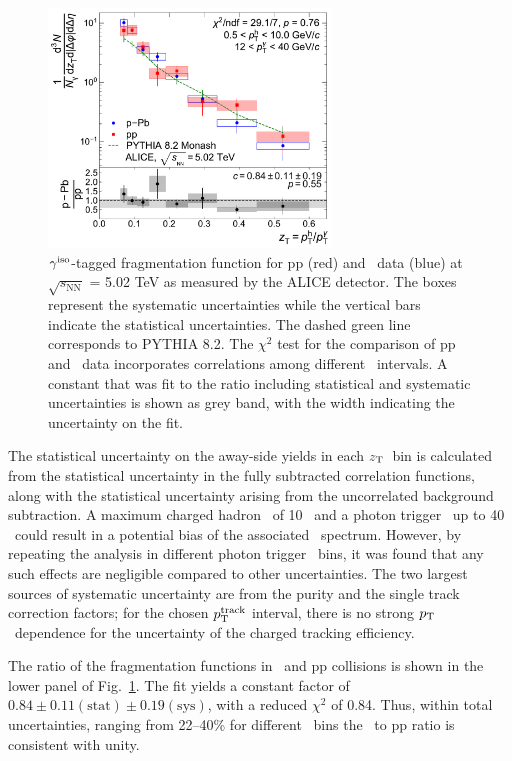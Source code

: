 \begin{figure}
    \centering
    \includegraphics[width=0.67\textwidth]{Data_Analysis/gammahadron/Final_FFunction_and_Ratio.pdf}
    \caption{$\gamma^\mathrm{iso}$-tagged fragmentation function for pp (red) and \pPb~data (blue) at $\sqrt{s_\mathrm{NN}}$ = 5.02 TeV as measured by the ALICE detector. The boxes represent the systematic uncertainties while the vertical bars indicate the statistical uncertainties. The dashed green line corresponds to \textsc{PYTHIA 8.2}. The $\chi^2$ test for the comparison of pp and \pPb~data incorporates correlations among different \zt~intervals. A constant that was fit to the ratio including statistical and systematic uncertainties is shown as grey band, with the width indicating the uncertainty on the fit.}
    \label{fig:Fragmentation_Functions}
\end{figure}

The statistical uncertainty on the away-side yields in each $z_{\mathrm{T}}$~bin is calculated from the statistical uncertainty in the fully subtracted correlation functions, along with the statistical uncertainty arising from the uncorrelated background subtraction. A maximum charged hadron \pt~of 10 \GeVc~and a photon trigger \pt~up to 40 \GeVc~could result in a potential bias of the associated \zt~spectrum. However, by repeating the analysis in different photon trigger \pt~bins, it was found that any such effects are negligible compared to other uncertainties. The two largest sources of systematic uncertainty are from the purity and the single track correction factors; for the chosen $p_{\mathrm{T}}^{\mathrm{track}}$ interval, there is no strong $p_{\mathrm{T}}$~dependence for the uncertainty of the charged tracking efficiency.

 The ratio of the fragmentation functions in \pPb~and pp collisions is shown in the lower panel of Fig.~\ref{fig:Fragmentation_Functions}.
The fit yields a constant factor of $0.84\pm0.11\mathrm{(stat)}\pm0.19\mathrm{(sys)}$, with a reduced $\chi^{2}$ of 0.84.  
 Thus, within total uncertainties, ranging from 22--40\% for different \zt~bins the \pPb~to pp ratio is consistent with unity. %



